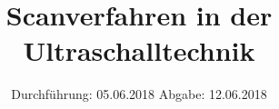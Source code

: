 
\usepackage{longtable}
\usepackage{wrapfig}
\usepackage{ dsfont }
\subject{VERSUCH US2}
\title{Scanverfahren in der Ultraschalltechnik}
\date{%
  \hspace{-2.5em}
  Durchführung: 05.06.2018
  \hspace{4em}
  Abgabe: 12.06.2018
}


  \setlength{\parindent}{0em}
  \maketitle
  \thispagestyle{empty}
  \newpage
  \tableofcontents
  \newpage





\printbibliography{}



